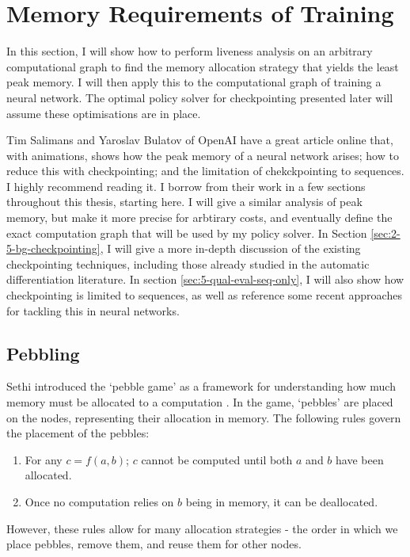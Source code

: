 \newpage
\section{Memory Requirements of Training} \label{sec:2-4-memory-analysis}
In this section, I will show how to perform liveness analysis on an arbitrary computational graph to find the memory allocation strategy that yields the least peak memory.
I will then apply this to the computational graph of training a neural network.
The optimal policy solver for checkpointing presented later will assume these optimisations are in place.

Tim Salimans and Yaroslav Bulatov of OpenAI have a great article online \cite{Bulatov-checkpointing-article} that, with animations, shows how the peak memory of a neural network arises; how to reduce this with checkpointing; and the limitation of chekckpointing to sequences.
I highly recommend reading it.
I borrow from their work in a few sections throughout this thesis, starting here.
I will give a similar analysis of peak memory, but make it more precise for arbtirary costs, and eventually define the exact computation graph that will be used by my policy solver.
In Section \ref{sec:2-5-bg-checkpointing}, I will give a more in-depth discussion of the existing checkpointing techniques, including those already studied in the automatic differentiation literature.
In section \ref{sec:5-qual-eval-seq-only}, I will also show how checkpointing is limited to sequences, as well as reference some recent approaches for tackling this in neural networks.

\subsection{Pebbling}
Sethi introduced the `pebble game' as a framework for understanding how much memory must be allocated to a computation \cite{Sethi1973}.
In the game, `pebbles' are placed on the nodes, representing their allocation in memory.
The following rules govern the placement of the pebbles:
\begin{enumerate}[topsep=0.1em]
    \item For any \(c = f(a, b)\); \(c\) cannot be computed until both \(a\) and \(b\) have been allocated.
    \item Once no computation relies on \(b\) being in memory, it can be deallocated.
\end{enumerate}
However, these rules allow for many allocation strategies - the order in which we place pebbles, remove them, and reuse them for other nodes.

